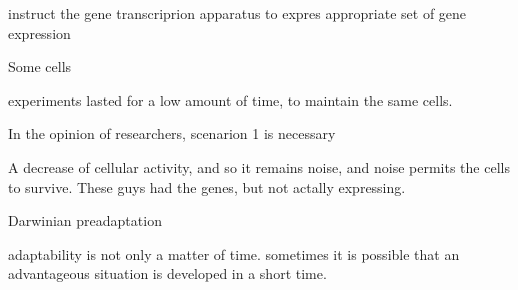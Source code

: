 instruct the gene transcriprion apparatus to expres appropriate set of gene expression

Some cells 

experiments lasted for a low amount of time, to maintain  the same cells. 


In the opinion of researchers, scenarion 1 is necessary 


A decrease of cellular activity, and so it remains noise, and noise permits the cells to survive. These guys had the genes, but not actally expressing. 

Darwinian preadaptation

adaptability is not only a matter of time. sometimes it is possible that an advantageous situation is developed in a short time. 